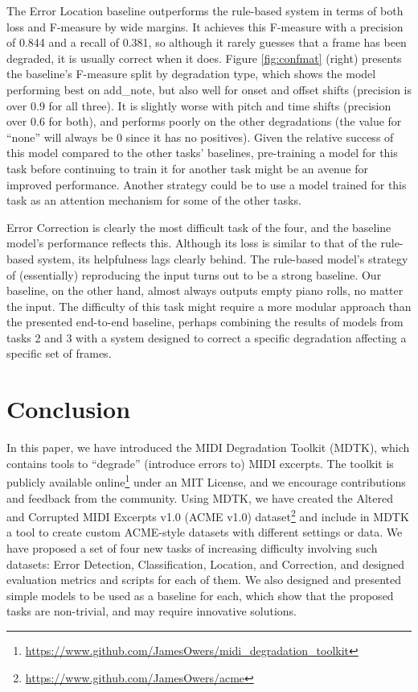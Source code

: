 \documentclass{article}
\def \mdtkurl {https://www.github.com/JamesOwers/midi_degradation_toolkit}
\def \acmeurl {https://www.github.com/JamesOwers/acme}
\begin{document}
The Error Location baseline outperforms the rule-based system in terms of both loss and F-measure by wide margins. It achieves this F-measure with a precision of 0.844 and a recall of 0.381, so although it rarely guesses that a frame has been degraded, it is usually correct when it does. Figure \ref{fig:confmat} (right) presents the baseline's F-measure split by degradation type, which shows the model performing best on add\_note, but also well for onset and offset shifts (precision is over $0.9$ for all three). It is slightly worse with pitch and time shifts (precision over $0.6$ for both), and performs poorly on the other degradations (the value for ``none'' will always be 0 since it has no positives). Given the relative success of this model compared to the other tasks' baselines, pre-training a model for this task before continuing to train it for another task might be an avenue for improved performance. Another strategy could be to use a model trained for this task as an attention mechanism for some of the other tasks.

Error Correction is clearly the most difficult task of the four, and the baseline model's performance reflects this. Although its loss is similar to that of the rule-based system, its helpfulness lags clearly behind. The rule-based model's strategy of (essentially) reproducing the input turns out to be a strong baseline. Our baseline, on the other hand, almost always outputs empty piano rolls, no matter the input. The difficulty of this task might require a more modular approach than the presented end-to-end baseline, perhaps combining the results of models from tasks 2 and 3 with a system designed to correct a specific degradation affecting a specific set of frames.

\section{Conclusion}
\label{sec:conc}
In this paper, we have introduced the MIDI Degradation Toolkit (MDTK), which contains tools to ``degrade'' (introduce errors to) MIDI excerpts. The toolkit is publicly available online\footnote{\url{\mdtkurl}} under an MIT License, and we encourage contributions and feedback from the community. Using MDTK, we have created the Altered and Corrupted MIDI Excerpts v1.0 (ACME v1.0) dataset\footnote{\url{\acmeurl}} and include in MDTK a tool to create custom ACME-style datasets with different settings or data. We have proposed a set of four new tasks of increasing difficulty involving such datasets: Error Detection, Classification, Location, and Correction, and designed evaluation metrics and scripts for each of them. We also designed and presented simple models to be used as a baseline for each, which show that the proposed tasks are non-trivial, and may require innovative solutions.
\end{document}
